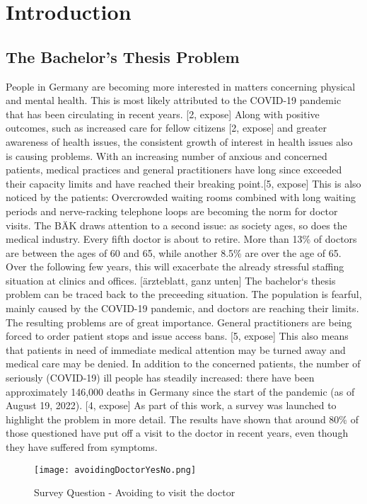 

\chapter{Introduction}


\section{The Bachelor's Thesis Problem}
People in Germany are becoming more interested in matters concerning physical and mental health. This is most likely attributed to the COVID-19 pandemic that has been circulating in recent years. [2, expose] Along with positive outcomes, such as increased care for fellow citizens [2, expose] and greater awareness of health issues, the consistent growth of interest in health issues also is causing problems. With an increasing number of anxious and concerned patients, medical practices and general practitioners have long since exceeded their capacity limits and have reached their breaking point.[5, expose] This is also noticed by the patients: Overcrowded waiting rooms combined with long waiting periods and nerve-racking telephone loops are becoming the norm for doctor visits. The BÄK draws attention to a second issue: as society ages, so does the medical industry. Every fifth doctor is about to retire. More than 13\% of doctors are between the ages of 60 and 65, while another 8.5\% are over the age of 65. Over the following few years, this will exacerbate the already stressful staffing situation at clinics and offices.  [ärzteblatt, ganz unten]
The bachelor`s thesis problem can be traced back to the preceeding situation. The population is fearful, mainly caused by the COVID-19 pandemic, and doctors are reaching their limits. The resulting problems are of great importance. General practitioners are being forced to order patient stops and issue access bans. [5, expose]  This also means that patients in need of immediate medical attention may be turned away and medical care may be denied. In addition to the concerned patients, the number of seriously (COVID-19) ill people has steadily increased: there have been approximately 146,000 deaths in Germany since the start of the pandemic (as of August 19, 2022). [4, expose] As part of this work, a survey was launched to highlight the problem in more detail. The results have shown that around 80\% of those questioned have put off a visit to the doctor in recent years, even though they have suffered from symptoms.
\begin{figure}[H]
	\centering
	\texttt{[image: avoidingDoctorYesNo.png]}
	\caption[Survey Question]{Survey Question - Avoiding to visit the doctor}
\end{figure}
